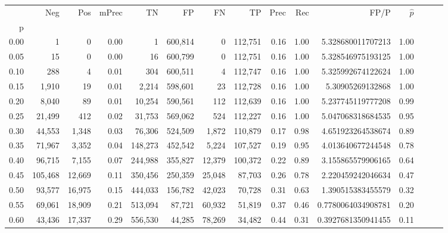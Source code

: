 \begin{tabular}{rrrrrrrrrrrrrrr}
\toprule
{} &      Neg &     Pos & mPrec &       TN &       FP &       FN &       TP &  Prec &   Rec &                   FP/P & $\hat{p}$ \\
p    &          &         &       &          &          &          &          &       &       &                        &           \\
\midrule
0.00 &        1 &       0 &  0.00 &        1 &  600,814 &        0 &  112,751 &  0.16 &  1.00 &      5.328680011707213 &      1.00 \\
0.05 &       15 &       0 &  0.00 &       16 &  600,799 &        0 &  112,751 &  0.16 &  1.00 &      5.328546975193125 &      1.00 \\
0.10 &      288 &       4 &  0.01 &      304 &  600,511 &        4 &  112,747 &  0.16 &  1.00 &      5.325992674122624 &      1.00 \\
0.15 &    1,910 &      19 &  0.01 &    2,214 &  598,601 &       23 &  112,728 &  0.16 &  1.00 &       5.30905269132868 &      1.00 \\
0.20 &    8,040 &      89 &  0.01 &   10,254 &  590,561 &      112 &  112,639 &  0.16 &  1.00 &      5.237745119777208 &      0.99 \\
0.25 &   21,499 &     412 &  0.02 &   31,753 &  569,062 &      524 &  112,227 &  0.16 &  1.00 &      5.047068318684535 &      0.95 \\
0.30 &   44,553 &   1,348 &  0.03 &   76,306 &  524,509 &    1,872 &  110,879 &  0.17 &  0.98 &      4.651923264538674 &      0.89 \\
0.35 &   71,967 &   3,352 &  0.04 &  148,273 &  452,542 &    5,224 &  107,527 &  0.19 &  0.95 &      4.013640677244548 &      0.78 \\
0.40 &   96,715 &   7,155 &  0.07 &  244,988 &  355,827 &   12,379 &  100,372 &  0.22 &  0.89 &      3.155865579906165 &      0.64 \\
0.45 &  105,468 &  12,669 &  0.11 &  350,456 &  250,359 &   25,048 &   87,703 &  0.26 &  0.78 &      2.220459242046634 &      0.47 \\
0.50 &   93,577 &  16,975 &  0.15 &  444,033 &  156,782 &   42,023 &   70,728 &  0.31 &  0.63 &      1.390515383455579 &      0.32 \\
0.55 &   69,061 &  18,909 &  0.21 &  513,094 &   87,721 &   60,932 &   51,819 &  0.37 &  0.46 &     0.7780064034908781 &      0.20 \\
0.60 &   43,436 &  17,337 &  0.29 &  556,530 &   44,285 &   78,269 &   34,482 &  0.44 &  0.31 &     0.3927681350941455 &      0.11 \\

\end{tabular}
